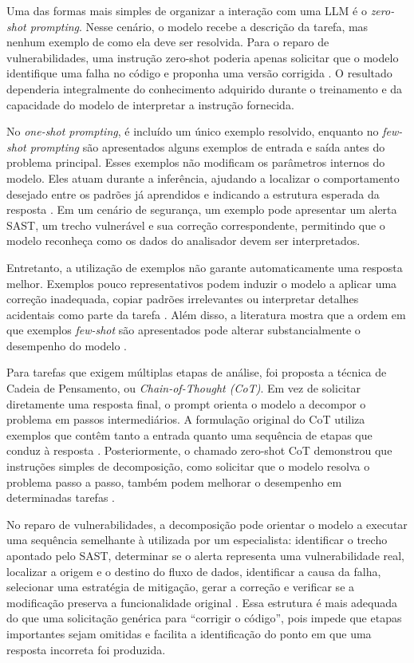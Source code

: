 Uma das formas mais simples de organizar a interação com uma LLM é o \textit{zero-shot prompting}. Nesse cenário, o modelo recebe a descrição da tarefa, mas nenhum exemplo de como ela deve ser resolvida. Para o reparo de vulnerabilidades, uma instrução zero-shot poderia apenas solicitar que o modelo identifique uma falha no código e proponha uma versão corrigida \cite{reynolds_prompt_2021}. O resultado dependeria integralmente do conhecimento adquirido durante o treinamento e da capacidade do modelo de interpretar a instrução fornecida.

No \textit{one-shot prompting}, é incluído um único exemplo resolvido, enquanto no \textit{few-shot prompting} são apresentados alguns exemplos de entrada e saída antes do problema principal. Esses exemplos não modificam os parâmetros internos do modelo. Eles atuam durante a inferência, ajudando a localizar o comportamento desejado entre os padrões já aprendidos e indicando a estrutura esperada da resposta \cite{reynolds_prompt_2021}. Em um cenário de segurança, um exemplo pode apresentar um alerta SAST, um trecho vulnerável e sua correção correspondente, permitindo que o modelo reconheça como os dados do analisador devem ser interpretados.

Entretanto, a utilização de exemplos não garante automaticamente uma resposta melhor. Exemplos pouco representativos podem induzir o modelo a aplicar uma correção inadequada, copiar padrões irrelevantes ou interpretar detalhes acidentais como parte da tarefa \cite{reynolds_prompt_2021}. Além disso, a literatura mostra que a ordem em que exemplos \textit{few-shot} são apresentados pode alterar substancialmente o desempenho do modelo \cite{lu_fantastically_2022}.

Para tarefas que exigem múltiplas etapas de análise, foi proposta a técnica de Cadeia de Pensamento, ou \textit{Chain-of-Thought (CoT)}. Em vez de solicitar diretamente uma resposta final, o prompt orienta o modelo a decompor o problema em passos intermediários. A formulação original do CoT utiliza exemplos que contêm tanto a entrada quanto uma sequência de etapas que conduz à resposta \cite{wei_chain--thought_2023}. Posteriormente, o chamado zero-shot CoT demonstrou que instruções simples de decomposição, como solicitar que o modelo resolva o problema passo a passo, também podem melhorar o desempenho em determinadas tarefas \cite{kojima_large_2023}.

No reparo de vulnerabilidades, a decomposição pode orientar o modelo a executar uma sequência semelhante à utilizada por um especialista: identificar o trecho apontado pelo SAST, determinar se o alerta representa uma vulnerabilidade real, localizar a origem e o destino do fluxo de dados, identificar a causa da falha, selecionar uma estratégia de mitigação, gerar a correção e verificar se a modificação preserva a funcionalidade original \cite{wei_chain--thought_2023, khan_code_2025}. Essa estrutura é mais adequada do que uma solicitação genérica para “corrigir o código”, pois impede que etapas importantes sejam omitidas e facilita a identificação do ponto em que uma resposta incorreta foi produzida.

